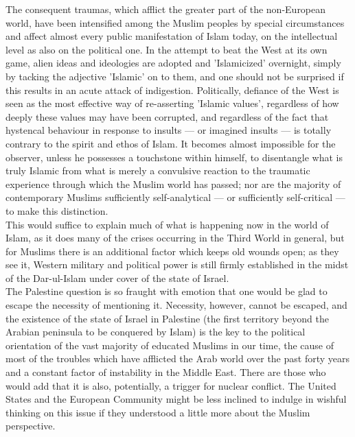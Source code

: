 \documentclass[11pt, b5paper, twoside]{book}
\begin{document}
The consequent traumas, which afflict the greater part of the non-European world, have been intensified among the Muslim peoples by special circumstances and affect almost every public manifestation of Islam today, on the intellectual level as also on the political one. In the attempt to beat the West at its own game, alien ideas and ideologies are adopted and 'Islamicized' overnight, simply by tacking the adjective 'Islamic' on to them, and one should not be surprised if this results in an acute attack of indigestion. Politically, defiance of the West is seen as the most effective way of re-asserting 'Islamic values', regardless of how deeply these values may have been corrupted, and regardless of the fact that hystencal behaviour in response to insults --- or imagined insults --- is totally contrary to the spirit and ethos of Islam. It becomes almost impossible for the observer, unless he possesses a touchstone within himself, to disentangle what is truly Islamic from what is merely a convulsive reaction to the traumatic experience through which the Muslim world has passed; nor are the majority of contemporary Muslims sufficiently self-analytical --- or sufficiently self-critical --- to make this distinction. \\

This would suffice to explain much of what is happening now in the world of Islam, as it does many of the crises occurring in the Third World in general, but for Muslims there is an additional factor which keeps old wounds open; as they see it, Western military and political power is still firmly established in the midst of the Dar-ul-Islam under cover of the state of Israel. \\

The Palestine question is so fraught with emotion that one would be glad to escape the necessity of mentioning it. Necessity, however, cannot be escaped, and the existence of the state of Israel in Palestine (the first territory beyond the Arabian peninsula to be conquered by Islam) is the key to the political orientation of the vast majority of educated Muslims in our time, the cause of most of the troubles which have afflicted the Arab world over the past forty years and a constant factor of instability in the Middle East. There are those who would add that it is also, potentially, a trigger for nuclear conflict. The United States and the European Community might be less inclined to indulge in wishful thinking on this issue if they understood a little more about the Muslim perspective. \\
\end{document}

